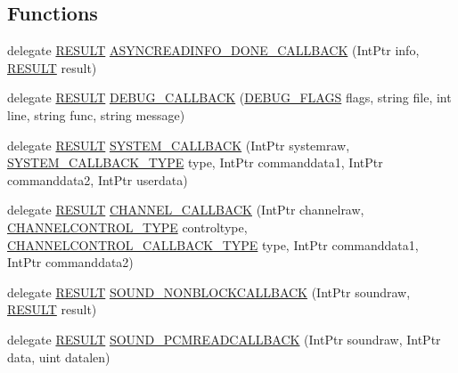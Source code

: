 \subsection*{Functions}
\begin{DoxyCompactItemize}
\item 
delegate \hyperlink{namespace_f_m_o_d_a305d1176ef3f8c8815861a60407ac33d}{R\+E\+S\+U\+LT} \hyperlink{namespace_f_m_o_d_aa16fd74612ccbefd30aaf6c72316a08f}{A\+S\+Y\+N\+C\+R\+E\+A\+D\+I\+N\+F\+O\+\_\+\+D\+O\+N\+E\+\_\+\+C\+A\+L\+L\+B\+A\+CK} (Int\+Ptr info, \hyperlink{namespace_f_m_o_d_a305d1176ef3f8c8815861a60407ac33d}{R\+E\+S\+U\+LT} result)
\item 
delegate \hyperlink{namespace_f_m_o_d_a305d1176ef3f8c8815861a60407ac33d}{R\+E\+S\+U\+LT} \hyperlink{namespace_f_m_o_d_a8af56b22e6aaa75d1cbe71accaa7d719}{D\+E\+B\+U\+G\+\_\+\+C\+A\+L\+L\+B\+A\+CK} (\hyperlink{namespace_f_m_o_d_ae26c0e42bca4d9ba2b529ed29cf35b33}{D\+E\+B\+U\+G\+\_\+\+F\+L\+A\+GS} flags, string file, int line, string func, string message)
\item 
delegate \hyperlink{namespace_f_m_o_d_a305d1176ef3f8c8815861a60407ac33d}{R\+E\+S\+U\+LT} \hyperlink{namespace_f_m_o_d_aa2778e41871e1fdfe9ecae550d4a45eb}{S\+Y\+S\+T\+E\+M\+\_\+\+C\+A\+L\+L\+B\+A\+CK} (Int\+Ptr systemraw, \hyperlink{namespace_f_m_o_d_aa5c808c3670f64c2b51ff4f216362a63}{S\+Y\+S\+T\+E\+M\+\_\+\+C\+A\+L\+L\+B\+A\+C\+K\+\_\+\+T\+Y\+PE} type, Int\+Ptr commanddata1, Int\+Ptr commanddata2, Int\+Ptr userdata)
\item 
delegate \hyperlink{namespace_f_m_o_d_a305d1176ef3f8c8815861a60407ac33d}{R\+E\+S\+U\+LT} \hyperlink{namespace_f_m_o_d_a3094c885d2c4a21049c65cb016a4cd3e}{C\+H\+A\+N\+N\+E\+L\+\_\+\+C\+A\+L\+L\+B\+A\+CK} (Int\+Ptr channelraw, \hyperlink{namespace_f_m_o_d_adc4f7881733d8b2dc1577194a8e248e4}{C\+H\+A\+N\+N\+E\+L\+C\+O\+N\+T\+R\+O\+L\+\_\+\+T\+Y\+PE} controltype, \hyperlink{namespace_f_m_o_d_a5d2474611c3f58385c86117a278bf1d7}{C\+H\+A\+N\+N\+E\+L\+C\+O\+N\+T\+R\+O\+L\+\_\+\+C\+A\+L\+L\+B\+A\+C\+K\+\_\+\+T\+Y\+PE} type, Int\+Ptr commanddata1, Int\+Ptr commanddata2)
\item 
delegate \hyperlink{namespace_f_m_o_d_a305d1176ef3f8c8815861a60407ac33d}{R\+E\+S\+U\+LT} \hyperlink{namespace_f_m_o_d_abfb747f8aa8ba3087d69eeb201052f2c}{S\+O\+U\+N\+D\+\_\+\+N\+O\+N\+B\+L\+O\+C\+K\+C\+A\+L\+L\+B\+A\+CK} (Int\+Ptr soundraw, \hyperlink{namespace_f_m_o_d_a305d1176ef3f8c8815861a60407ac33d}{R\+E\+S\+U\+LT} result)
\item 
delegate \hyperlink{namespace_f_m_o_d_a305d1176ef3f8c8815861a60407ac33d}{R\+E\+S\+U\+LT} \hyperlink{namespace_f_m_o_d_a18d6e3099b43340594b358d71a50af80}{S\+O\+U\+N\+D\+\_\+\+P\+C\+M\+R\+E\+A\+D\+C\+A\+L\+L\+B\+A\+CK} (Int\+Ptr soundraw, Int\+Ptr data, uint datalen)

\end{DoxyCompactItemize}
